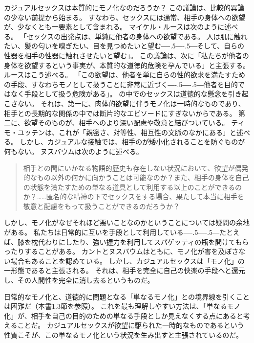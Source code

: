 \documentclass[paper=a4,book,openany]{jlreq}
\def\DDASH{―\kern-.5\zw―\kern-.5\zw―} %
\begin{document}
カジュアルセックスは本質的にモノ化なのだろうか？ この議論は、比較的異論の少ない前提から始まる。
すなわち、セックスには通常、相手の身体への欲望が、少なくとも一要素として含まれる。
マイケル・ルースは次のように述べる。
「セックスの出発点は、単純に他者の身体への欲望である。
人は肌に触れたい、髪の匂いを嗅ぎたい、目を見つめたいと望む{\DDASH}そして、自らの性器を相手の性器に触れさせたいと望む」。
この議論は、次に「私たちが他者の身体を欲望するという事実が、本質的な道徳的危険を孕んでいる」と主張する。
ルースはこう述べる。
「この欲望は、他者を単に自らの性的欲求を満たすための手段、すなわちモノとして扱うことに非常に近づく{\DDASH}他者を目的ではなく手段として扱う危険がある」\citep[p.185]{ruse88:_homos}。
の中でのセックスは道徳的な懸念を引き起こさない。
それは、第一に、肉体的欲望に伴うモノ化は一時的なものであり、相手との長期的な関係の中では断片的なエピソードにすぎないからである。
第二に、欲望そのものが、相手へのより深い配慮や敬意と結びついている。
ティモ・ユッテンは、これが「親密さ、対等性、相互性の文脈のなかにある」と述べる\citep[p.31]{jutten16:_sexual_objec}。
しかし、カジュアルな接触では、相手のが矮小化されることを防ぐものが何もない。
ヌスバウムは次のように述べる。

\begin{quote}
  相手との間にいかなる物語的歴史も存在しない状況において、欲望が偶発的なもの以外の何かに向かうことは可能なのか？また、相手の身体を自己の状態を満たすための単なる道具として利用する以上のことができるのか？……匿名的な精神の下でセックスをする場合、果たして本当に相手を敬意と配慮をもって扱うことができるのだろうか？\citep[p.287]{nussbaum95:_objec}
\end{quote}

しかし、モノ化がなぜそれほど悪いことなのかということについては疑問の余地がある。
私たちは日常的に互いを手段として利用している{\DDASH}たとえば、膝を枕代わりにしたり、強い握力を利用してスパゲッティの瓶を開けてもらったりすることがある。
カントとヌスバウムはともに、モノ化が害を及ぼさない場合もあることを認めている。
しかし、カジュアルセックスは「モノ化」の一形態であると主張される。
それは、相手を完全に自己の快楽の手段へと還元し、その人間性を完全に消し去るというものだ。

日常的なモノ化と、道徳的に問題となる「単なるモノ化」との境界線を引くことは困難だ（本書1.3節を参照）。
これを最も理解しやすい方法は、「単なるモノ化」が、相手を自己の目的のための単なる手段としか見えなくする点にあると考えることだ。
カジュアルセックスが欲望に駆られた一時的なものであるという性質こそが、この単なるモノ化という状況を生み出すと主張されているのだ。
\end{document}
